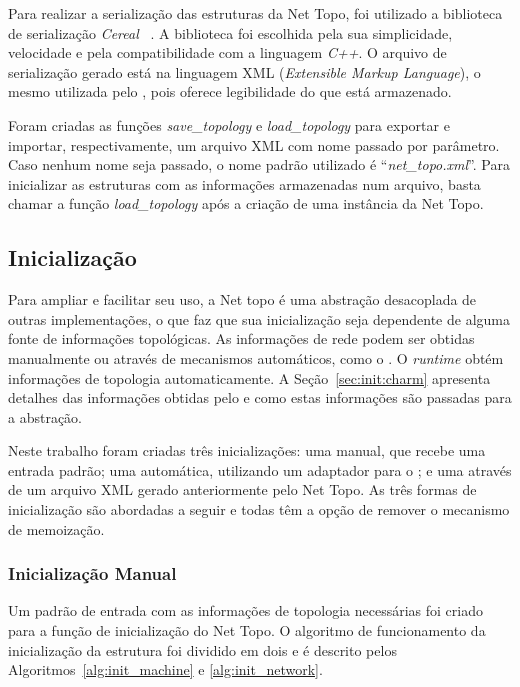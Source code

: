 Para realizar a serialização das estruturas da Net Topo, foi utilizado a biblioteca de serialização \textit{Cereal} ~\cite{website:Cereal}. 
A biblioteca foi escolhida pela sua simplicidade, velocidade e pela compatibilidade com a linguagem \textit{C++}.
O arquivo de serialização gerado está na linguagem XML (\textit{Extensible Markup Language}), o mesmo utilizada pelo \hwloc, pois oferece legibilidade do que está armazenado.

Foram criadas as funções \textit{save\_topology} e \textit{load\_topology} para exportar e importar, respectivamente, um arquivo XML com nome passado por parâmetro.
Caso nenhum nome seja passado, o nome padrão utilizado é ``\textit{net\_topo.xml}''.
Para inicializar as estruturas com as informações armazenadas num arquivo, basta chamar a função \textit{load\_topology} após a criação de uma instância da Net Topo.


\subsection{Inicialização}
\label{sec:init}

Para ampliar e facilitar seu uso, a Net topo é uma abstração desacoplada de outras implementações, o que faz que sua inicialização seja dependente de alguma fonte de informações topológicas.
As informações de rede podem ser obtidas manualmente ou através de mecanismos automáticos, como o \netloc.
O \textit{runtime} \charm obtém informações de topologia automaticamente.
A Seção~\ref{sec:init:charm} apresenta detalhes das informações obtidas pelo \charm e como estas informações são passadas para a abstração.

Neste trabalho foram criadas três inicializações: uma manual, que recebe uma entrada padrão; uma automática, utilizando um adaptador para o \charm; e uma através de um arquivo XML gerado anteriormente pelo Net Topo.
As três formas de inicialização são abordadas a seguir e todas têm a opção de remover o mecanismo de memoização.

\subsubsection{Inicialização Manual}

Um padrão de entrada com as informações de topologia necessárias foi criado para a função de inicialização do Net Topo.
O algoritmo de funcionamento da inicialização da estrutura foi dividido em dois e é descrito pelos Algoritmos~\ref{alg:init_machine} e \ref{alg:init_network}. 


